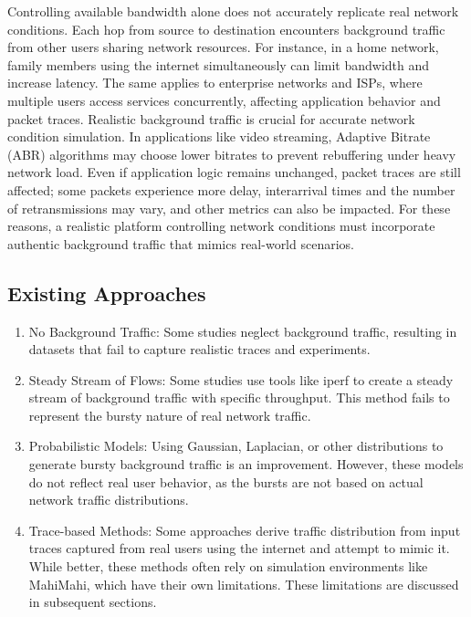 Controlling available bandwidth alone does not accurately replicate real network conditions. Each hop from source to destination encounters background traffic from other users sharing network resources. For instance, in a home network, family members using the internet simultaneously can limit bandwidth and increase latency. The same applies to enterprise networks and ISPs, where multiple users access services concurrently, affecting application behavior and packet traces.
Realistic background traffic is crucial for accurate network condition simulation. In applications like video streaming, Adaptive Bitrate (ABR) algorithms may choose lower bitrates to prevent rebuffering under heavy network load. Even if application logic remains unchanged, packet traces are still affected; some packets experience more delay, interarrival times and the number of retransmissions may vary, and other metrics can also be impacted.
For these reasons, a realistic platform controlling network conditions must incorporate authentic background traffic that mimics real-world scenarios.

\subsection{Existing Approaches}
\begin{enumerate}
    \item No Background Traffic: Some studies neglect background traffic, resulting in datasets that fail to capture realistic traces and experiments.
    \item Steady Stream of Flows: Some studies use tools like iperf to create a steady stream of  background traffic with specific throughput. This method fails to represent the bursty nature of real network traffic.
    \item Probabilistic Models: Using Gaussian, Laplacian, or other distributions to generate bursty background traffic is an improvement. However, these models do not reflect real user behavior, as the bursts are not based on actual network traffic distributions.
    \item Trace-based Methods: Some approaches derive traffic distribution from input traces captured from real users using the internet and attempt to mimic it. While better, these methods often rely on simulation environments like MahiMahi, which have their own limitations. These limitations are discussed in subsequent sections.
\end{enumerate}


